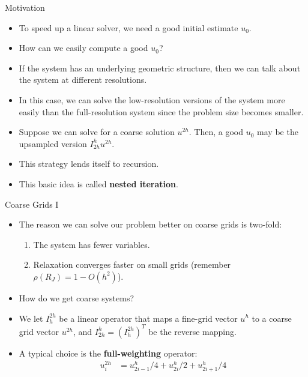 \documentclass{beamer}
\begin{document}
\begin{frame}{Motivation}
 \begin{itemize}
  \item To speed up a linear solver, we need a good initial estimate $u_0$.
  \item How can we easily compute a good $u_0$?
  \item If the system has an underlying geometric structure, then we can talk
        about the system at different resolutions.
  \item In this case, we can solve the low-resolution versions of the system
        more easily than the full-resolution system since the problem size
        becomes smaller.
  \item Suppose we can solve for a coarse solution $u^{2h}$. Then, a good $u_0$
        may be the upsampled version $I_{2h}^hu^{2h}$.
  \item This strategy lends itself to recursion.
  \item This basic idea is called \textbf{nested iteration}.
 \end{itemize}
\end{frame}

\begin{frame}{Coarse Grids I}
 \begin{itemize}
  \item The reason we can solve our problem better on coarse grids is two-fold:
  \begin{enumerate}
   \item The system has fewer variables.
   \item Relaxation converges faster on small grids (remember $\rho(R_J)=1-O(h^2)$).
  \end{enumerate}
  \item How do we get coarse systems?
  \item We let $I_h^{2h}$ be a linear operator that maps a fine-grid vector $u^{h}$
        to a coarse grid vector $u^{2h}$, and $I_{2h}^h = (I_h^{2h})^T$ be the reverse
        mapping.
  \item A typical choice is the \textbf{full-weighting} operator:
  \begin{align}
   u_i^{2h} &= u_{2i-1}^h/4 + u_{2i}^h/2 + u_{2i+1}^h/4
  \end{align}    
 \end{itemize}
\end{frame}
\end{document}
